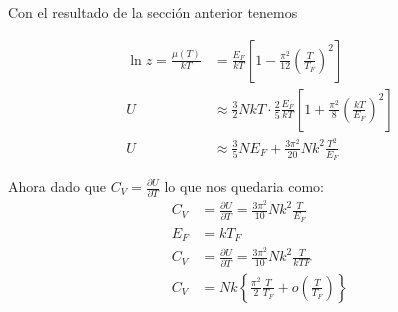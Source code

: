 \documentclass{report}
\begin{document}
Con el resultado de la sección anterior tenemos

\begin{align*}
  \ln z = \frac{\mu(T)}{kT} &= \frac{E_F}{kT} \left[ 1 - \frac{\pi^2}{12} \left( \frac{T}{T_F} \right)^2 \right]\\
  U &\approx \frac{3}{2} NkT \cdot \frac{2}{5} \frac{E_F}{kT} \left[ 1 + \frac{\pi^2}{8} \left( \frac{kT}{E_F} \right)^2 \right]\\
  U &\approx \frac{3}{5} N E_F + \frac{3\pi^2}{20} Nk^2 \frac{T^2}{E_F}
\end{align*}

Ahora dado que $C_V = \frac{\partial U}{\partial T}$ lo que nos quedaria como:
\begin{align*}
  C_V &= \frac{\partial U}{\partial T} = \frac{3\pi^2}{10} Nk^2 \frac{T}{E_F}\\
  E_F &= kT_F\\
  C_V &= \frac{\partial U}{\partial T} = \frac{3\pi^2}{10} Nk^2 \frac{T}{kTF}\\
  C_V &= Nk \left\{\frac{\pi^2}{2} \frac{T}{T_F} + o\left( \frac{T}{T_F} \right)\right\}
\end{align*}

\section{}



\chapter{}

\section{}

\section{}

\section{}

\section{}
\end{document}
